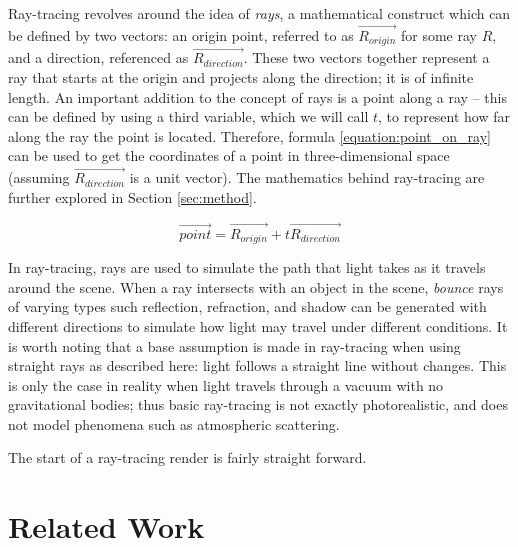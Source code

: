 \documentclass[11pt]{article}
\newcommand{\rayorg}{\vec{R_{origin}}}
\newcommand{\raydir}{\vec{R_{direction}}}
\begin{document}
Ray-tracing revolves around the idea of {\it rays}, a mathematical construct which can be defined by two vectors: an origin point, referred to as $\rayorg$ for some ray $R$, and a direction, referenced as $\raydir$.
These two vectors together represent a ray that starts at the origin and projects along the direction; it is of infinite length. An important addition to the concept of rays is a point along a ray -- this can be defined by using a third variable, which we will call $t$, to represent how far along the ray the point is located.
Therefore, formula \ref{equation:point_on_ray} can be used to get the coordinates of a point in three-dimensional space (assuming $\raydir$ is a unit vector). The mathematics behind ray-tracing are further explored in Section \ref{sec:method}.

\begin{equation}
  \label{equation:point_on_ray}
  \vec{point} = \rayorg + t\raydir
\end{equation}

In ray-tracing, rays are used to simulate the path that light takes as it travels around the scene.
When a ray intersects with an object in the scene, {\it bounce} rays of varying types such reflection, refraction, and shadow can be generated with different directions to simulate how light may travel under different conditions.
It is worth noting that a base assumption is made in ray-tracing when using straight rays as described here: light follows a straight line without changes.
This is only the case in reality when light travels through a vacuum with no gravitational bodies; thus basic ray-tracing is not exactly photorealistic, and does not model phenomena such as atmospheric scattering.

The start of a ray-tracing render is fairly straight forward.



\section{Related Work}
\label{sec:relatedwork}

\end{document}
